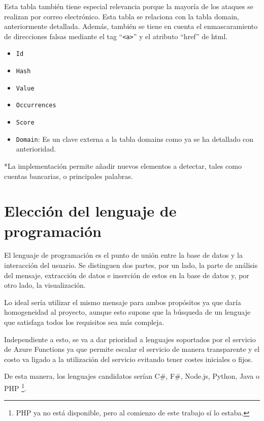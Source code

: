 \begin{itemize}
Esta tabla también tiene especial relevancia porque la mayoría de los ataques se realizan por correo electrónico. Esta tabla se relaciona con la tabla domain, anteriormente detallada. Además, también se tiene en cuenta el enmascaramiento de direcciones falsas mediante el tag “\verb!<a>!” y el atributo “href” de html.
\begin{itemize}
    \item \texttt{Id}
    \item \texttt{Hash}
    \item \texttt{Value}
    \item \texttt{Occurrences}
    \item \texttt{Score}
    \item \texttt{Domain}: Es un clave externa a la tabla domains como ya se ha detallado con anterioridad.
\end{itemize}

\end{itemize}
*La implementación permite añadir nuevos elementos a detectar, tales como cuentas bancarias, o principales palabras.

\section{Elección del lenguaje de programación}
El lenguaje de programación es el punto de unión entre la base de datos y la interacción del usuario. Se distinguen dos partes, por un lado, la parte de análisis del mensaje, extracción de datos e inserción de estos en la base de datos y, por otro lado, la visualización.

Lo ideal sería utilizar el mismo mensaje para ambos propósitos ya que daría homogeneidad al proyecto, aunque esto supone que la búsqueda de un lenguaje que satisfaga todos los requisitos sea más compleja.

Independiente a esto, se va a dar prioridad a lenguajes soportados por el servicio de Azure Functions ya que permite escalar el servicio de manera transparente y el costo va ligado a la utilización del servicio evitando tener costes iniciales o fijos.

De esta manera, los lenguajes candidatos serían C\#, F\#, Node.js, Python, Java o PHP \footnote{PHP ya no está disponible, pero al comienzo de este trabajo sí lo estaba.}.


